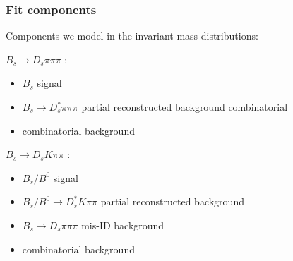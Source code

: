 \documentclass[]{beamer}
\begin{document}
\begin{frame}
\frametitle{Fit components}

Components we model in the invariant mass distributions:\newline

$B_{s}\to D_{s}\pi\pi\pi$ :

\begin{itemize}

 \item $B_{s}$ signal

 \item  $B_{s}\to D_{s}^{*}\pi\pi\pi$ partial reconstructed background combinatorial

\item combinatorial background

\end{itemize}



$B_{s}\to D_{s}K\pi\pi$ :

\begin{itemize}

\item $B_{s}/B^{0}$ signal

\item  $B_{s}/B^{0}\to D_{s}^{*}K\pi\pi$ partial reconstructed background

\item  $B_{s}\to D_{s}\pi\pi\pi$ mis-ID background

\item combinatorial background 

\end{itemize}


\end{frame}
\end{document}
